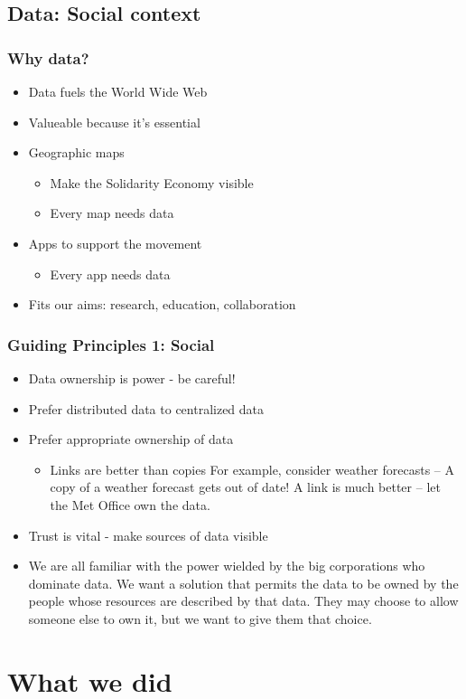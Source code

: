 \subsection{Data: Social context}
\frame
{
  \frametitle{Why data?}
  \begin{itemize}
    \item<1-> Data fuels the World Wide Web
    \item<1-> Valueable because it's essential
    \item<2-> Geographic maps
      \begin{itemize}
	\item Make the Solidarity Economy visible
	\item Every map needs data
      \end{itemize}
    \item<3-> Apps to support the movement
      \begin{itemize}
	\item Every app needs data
      \end{itemize}
    \item<4-> Fits our aims: research, education, collaboration
  \end{itemize}
}
\frame
{
  \frametitle{Guiding Principles 1: Social}
  \begin{itemize}
    \item Data ownership is power - be careful!
    \item Prefer distributed data to centralized data
    \item Prefer appropriate ownership of data
      \begin{itemize}
	\item Links are better than copies
	  \only<article> {For example, consider weather forecasts --
	  A copy of a weather forecast gets out of date!
	  A link is much better -- let the Met Office own the data.}
      \end{itemize}
    \item Trust is vital - make sources of data visible
    \item<article> We are all familiar with the power wielded by the big corporations who dominate data.
      We want a solution that permits the data to be owned by the people whose resources are described by that data.
      They may choose to allow someone else to own it, but we want to give them that choice.
  \end{itemize}
}
\section{What we did}

